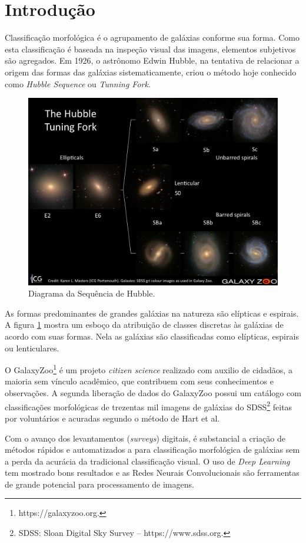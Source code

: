 \section*{Introdução}

Classificação morfológica é o agrupamento de galáxias conforme sua forma. Como esta classificação é baseada na inspeção visual das imagens, elementos subjetivos são agregados. Em 1926, o astrônomo Edwin Hubble, na tentativa de relacionar a origem das formas das galáxias sistematicamente, criou o método hoje conhecido como \emph{Hubble Sequence} ou \emph{Tunning Fork}. \cite{hubble1926, fortson2012}

\begin{figure}[h!]
  \centering
  \includegraphics[width=.8\textwidth]{figures/tuningfork1.jpg}
  \caption{Diagrama da Sequência de Hubble.}
  \label{fig:tuningfork}
\end{figure}

As formas predominantes de grandes galáxias na natureza são elípticas e espirais. A figura \ref{fig:tuningfork} mostra um esboço da atribuição de classes discretas às galáxias de acordo com suas formas. Nela as galáxias são classificadas como elípticas, espirais ou lenticulares. \cite{fortson2012}

O GalaxyZoo\footnote{https://galaxyzoo.org.} é um projeto \emph{citizen science} realizado com auxilio de cidadãos, a maioria sem vínculo acadêmico, que contribuem com seus conhecimentos e observações. A segunda liberação de dados do GalaxyZoo possui um catálogo com classificações morfológicas de trezentas mil imagens de galáxias do SDSS\footnote{SDSS: Sloan Digital Sky Survey -- https://www.sdss.org.} feitas por voluntários e acuradas segundo o método de Hart et al. \cite{hart2016}

Com o avanço dos levantamentos (\emph{surveys}) digitais, é substancial a criação de métodos rápidos e automatizados a para classificação morfológica de galáxias sem a perda da acurácia da tradicional classificação visual. \cite{yamauchi2005} O uso de \emph{Deep Learning} tem mostrado bons resultados e as Redes Neurais Convolucionais são ferramentas de grande potencial para processamento de imagens. \cite{barchi2020, dai2018}

